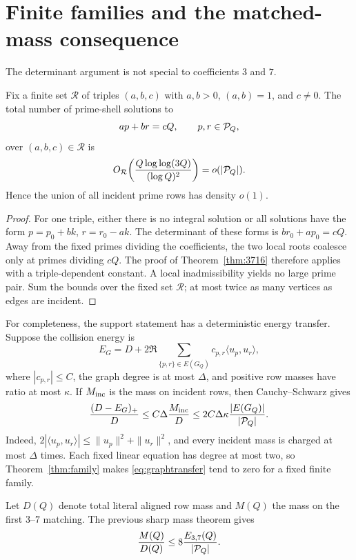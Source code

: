 \section{Finite families and the matched-mass consequence}

The determinant argument is not special to coefficients $3$ and $7$.

\begin{theorem}\label{thm:family}
Fix a finite set $\mathcal R$ of triples $(a,b,c)$ with $a,b>0$, $(a,b)=1$, and
$c\ne0$.  The total number of prime-shell solutions to
\[
 ap+br=cQ,\qquad p,r\in\mathcal P_Q,
\]
over $(a,b,c)\in\mathcal R$ is
\[
 O_{\mathcal R}\!\left(\frac{Q\log\log(3Q)}{(\log Q)^2}\right)
 =o(|\mathcal P_Q|).
\]
Hence the union of all incident prime rows has density $o(1)$.
\end{theorem}

\begin{proof}
For one triple, either there is no integral solution or all solutions have the form
$p=p_0+bk$, $r=r_0-ak$.  The determinant of these forms is
$br_0+ap_0=cQ$.  Away from the fixed primes dividing the coefficients, the two local
roots coalesce only at primes dividing $cQ$.  The proof of
Theorem~\ref{thm:3716} therefore applies with a triple-dependent constant.  A local
inadmissibility yields no large prime pair.  Sum the bounds over the fixed set
$\mathcal R$; at most twice as many vertices as edges are incident.
\end{proof}

For completeness, the support statement has a deterministic energy transfer.  Suppose
the collision energy is
\[
 E_G=D+2\Re\sum_{\{p,r\}\in E(G_Q)}c_{p,r}\langle u_p,u_r\rangle,
\]
where $|c_{p,r}|\le C$, the graph degree is at most $\Delta$, and positive row
masses have ratio at most $\kappa$.  If $M_{\rm inc}$ is the mass on incident rows,
then Cauchy--Schwarz gives
\begin{equation}
 \frac{(D-E_G)_+}{D}
 \le C\Delta\frac{M_{\rm inc}}D
 \le 2C\Delta\kappa\frac{|E(G_Q)|}{|\mathcal P_Q|}.          \label{eq:graphtransfer}
\end{equation}
Indeed, $2|\langle u_p,u_r\rangle|\le\|u_p\|^2+\|u_r\|^2$, and every incident
mass is charged at most $\Delta$ times.  Each fixed linear equation has degree at most
two, so Theorem~\ref{thm:family} makes \eqref{eq:graphtransfer} tend to zero for a
fixed finite family.

Let $D(Q)$ denote total literal aligned row mass and $M(Q)$ the mass on the first
$3$--$7$ matching.  The previous sharp mass theorem gives
\[
 \frac{M(Q)}{D(Q)}\le 8\frac{E_{3,7}(Q)}{|\mathcal P_Q|}.
\]

